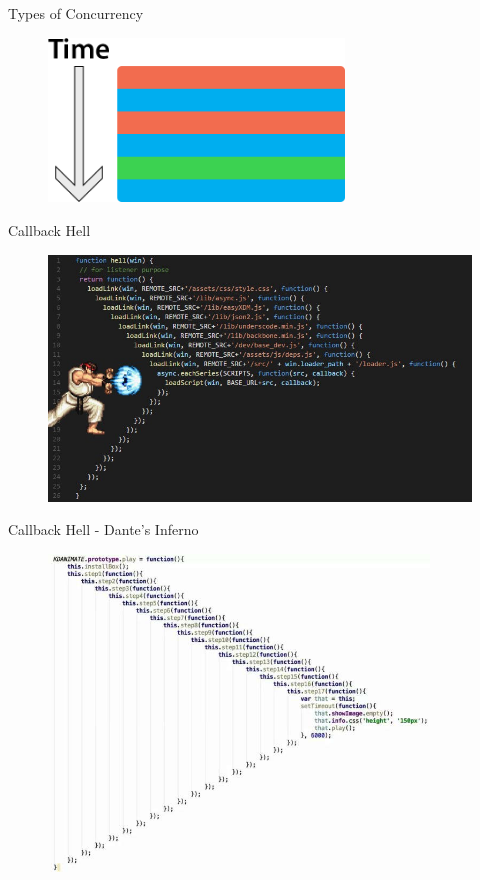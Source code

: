 \begin{frame}{Types of Concurrency}
	\begin{figure}[h]
		\includegraphics[width=0.7\textwidth,page=1]{gfx/asynchronous_wait}
	\end{figure}
\end{frame}

\begin{frame}{Callback Hell}
	\begin{figure}[h]
		\includegraphics[width=1.0\textwidth,page=1]{gfx/callback_hadouken}
	\end{figure}
\end{frame}

\begin{frame}{Callback Hell - Dante's Inferno}
	\begin{figure}[h]
		\includegraphics[width=0.9\textwidth,page=1]{gfx/extreme_callback}
	\end{figure}
\end{frame}
